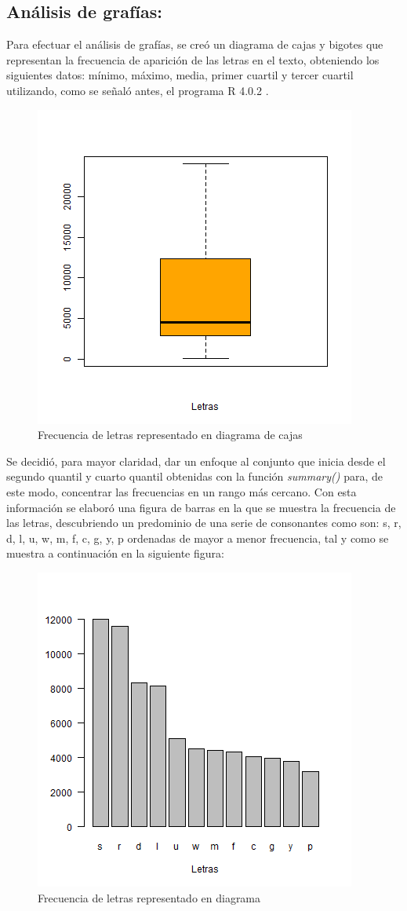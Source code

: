 \documentclass[]{article}
\begin{document}
\subsection{Análisis de grafías:}
Para efectuar el análisis de grafías, se creó un diagrama de cajas y bigotes que representan la frecuencia de aparición de las letras en el texto, obteniendo los siguientes datos: mínimo, máximo, media, primer cuartil y tercer cuartil utilizando, como se señaló antes, el programa R 4.0.2  \cite{rproject}. 

\begin{figure}[H]
    \centering
    \includegraphics[width=.5\linewidth]{boxplot.png}    \caption{Frecuencia de letras representado en diagrama de cajas}
    \label{boxplot}
\end{figure}

Se decidió, para mayor claridad, dar un enfoque al conjunto que inicia desde el segundo quantil y cuarto quantil obtenidas con la función \textit{summary()} para, de este modo, concentrar las frecuencias en un rango más cercano. 
 Con esta información se elaboró una figura de barras en la que se muestra la frecuencia de las letras, descubriendo un predominio de una serie de consonantes como son: s, r, d, l, u, w, m, f, c, g, y, p ordenadas de mayor a menor frecuencia, tal y como se muestra a continuación en la siguiente figura:

 

\begin{figure}[H]
    \centering
    \includegraphics[width=.5\linewidth]{Letras.png}    \caption{Frecuencia de letras representado en diagrama}
    \label{letras}
\end{figure}
\end{document}
